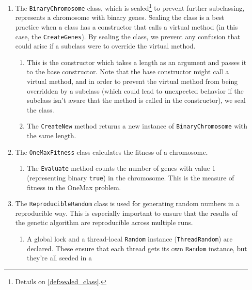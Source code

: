   \begin{enumerate}
    \item[1-8] The \texttt{BinaryChromosome} class, which is sealed\footnote{
        Details on \vref{def:sealed_class}.
      } to prevent further subclassing, represents a chromosome with binary 
      genes.
      Sealing the class is a best practice when a class has a constructor 
      that calls a virtual method (in this case, the \texttt{CreateGenes}).
      By sealing the class, we prevent any confusion that could arise if a 
      subclass were to override the virtual method.
      \begin{enumerate}
        \item[2-4] This is the constructor which takes a length as an argument 
          and passes it to the base constructor.
          Note that the base constructor might call a virtual method, and in 
          order to prevent the virtual method from being overridden by a 
          subclass (which could lead to unexpected behavior if the subclass 
          isn't aware that the method is called in the constructor), we seal 
          the class.
        \item[4-7] The \texttt{CreateNew} method returns a new instance of
          \texttt{BinaryChromosome} with the same length.
      \end{enumerate}
    \item[9-13] The \texttt{OneMaxFitness} class calculates the fitness of a 
      chromosome.
      \begin{enumerate}
        \item[10-12] The \texttt{Evaluate} method counts the number of genes 
          with value 1 (representing binary \texttt{true}) in the 
          chromosome.
          This is the measure of fitness in the OneMax problem.
      \end{enumerate}
    \item[14-35] The \texttt{ReproducibleRandom} class is used for 
      generating random numbers in a reproducible way.
      This is especially important to ensure that the results of the genetic
      algorithm are reproducible across multiple runs.
      \begin{enumerate}
        \item[15-17] A global lock and a thread-local 
          \texttt{Random} instance 
          (\texttt{ThreadRandom}) are declared.
          These ensure that each thread gets its own
          \texttt{Random} instance, but they're all seeded in a 

\end{enumerate}
\end{enumerate}
